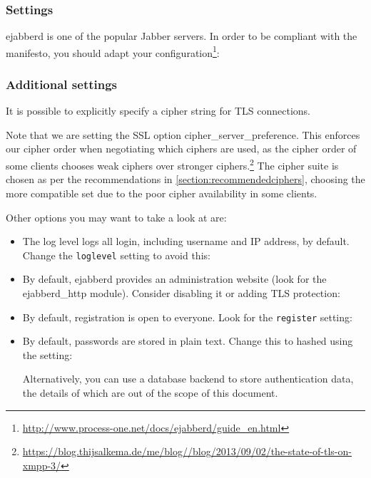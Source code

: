 \subsubsection{Settings}
ejabberd is one of the popular Jabber servers. In order to be compliant
with the manifesto, you should adapt your configuration\footnote{\url{http://www.process-one.net/docs/ejabberd/guide_en.html}}:

% 
\subsubsection{Additional settings}
It is possible to explicitly specify a cipher string for TLS connections.

Note that we are setting the SSL option cipher\_server\_preference. This enforces our cipher order when negotiating which ciphers are used, as the cipher order of some clients chooses weak ciphers over stronger ciphers.\footnote{\url{https://blog.thijsalkema.de/me/blog//blog/2013/09/02/the-state-of-tls-on-xmpp-3/}} The cipher suite is chosen as per the recommendations in \autoref{section:recommendedciphers}, choosing the more compatible set due to the poor cipher availability in some clients.

Other options you may want to take a look at are:
\begin{itemize}
\item The log level logs all login, including username and IP address, by default. Change the \texttt{loglevel} setting to avoid this:\\
\item By default, ejabberd provides an administration website (look for the ejabberd\_http module). Consider disabling it or adding TLS protection:\\
\item By default, registration is open to everyone. Look for the \texttt{register} setting:\\
\item By default, passwords are stored in plain text. Change this to hashed using the setting:\\

Alternatively, you can use a database backend to store authentication data, the details of which are out of the scope of this document.
\end{itemize}

